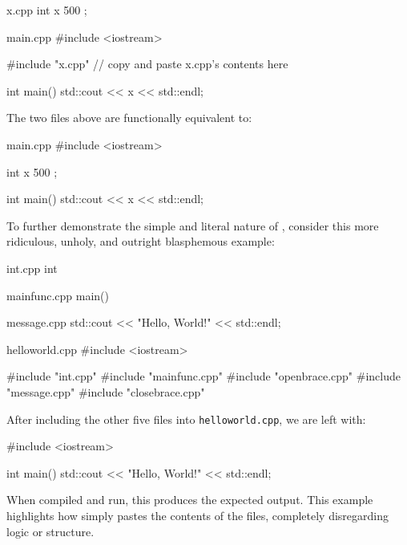 \documentclass[12pt]{article}
\begin{document}
\begin{cxx}{x.cpp}
int x { 500 };
\end{cxx}

\begin{cxx}{main.cpp}
#include <iostream>

#include "x.cpp" // copy and paste x.cpp's contents here

int main()
{
	std::cout << x << std::endl;
}
\end{cxx}

\noindent
The two files above are functionally equivalent to:

\begin{cxx}{main.cpp}
#include <iostream>

int x { 500 };

int main()
{
	std::cout << x << std::endl;
}
\end{cxx}

\noindent
To further demonstrate the simple and literal nature of , consider this more ridiculous, unholy, and outright blasphemous example:

\begin{cxx}{int.cpp}
int
\end{cxx}

\begin{cxx}{mainfunc.cpp}
main()
\end{cxx}

\begin{cxx}{openbrace.cpp}
{
\end{cxx}

\begin{cxx}{message.cpp}
std::cout << "Hello, World!" << std::endl;
\end{cxx}

\begin{cxx}{closebrace.cpp}
}
\end{cxx}

\begin{cxx}{helloworld.cpp}
#include <iostream>

#include "int.cpp"
#include "mainfunc.cpp"
#include "openbrace.cpp"
#include "message.cpp"
#include "closebrace.cpp"
\end{cxx}


\begin{explanation}
After including the other five files into \texttt{helloworld.cpp}, we are left with:

\begin{cxx}{}
#include <iostream>

int
main()
{
std::cout << "Hello, World!" << std::endl;
}
\end{cxx}

\noindent
When compiled and run, this produces the expected output. This example highlights how  simply pastes the contents of the files, completely disregarding logic or structure.
\end{explanation}
\end{document}
